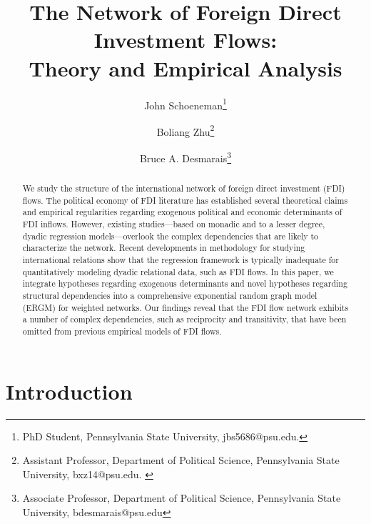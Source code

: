 \documentclass[12pt]{article}
\begin{document}
\title{The Network of Foreign Direct Investment Flows: \\Theory and Empirical Analysis}
\author{John  Schoeneman\thanks{\footnotesize{
PhD Student, Pennsylvania State University, jbs5686@psu.edu.}} \and Boliang Zhu\thanks{\footnotesize{Assistant Professor, Department of Political Science, Pennsylvania State University, bxz14@psu.edu. }} \and Bruce A. Desmarais\thanks{\footnotesize{Associate Professor, Department of Political Science, Pennsylvania State University, bdesmarais@psu.edu}}}
\date{}
\maketitle

\singlespacing
\begin{abstract}
    \noindent We study the structure of the international network of foreign direct investment (FDI) flows. The political economy of FDI literature has established several theoretical claims and empirical regularities regarding exogenous political and economic determinants of FDI inflows. %
    However, existing studies---based on monadic and to a lesser degree, dyadic regression models---overlook the complex dependencies that are likely to characterize the network. Recent developments in methodology for studying international relations show that the regression framework is typically inadequate for quantitatively modeling dyadic relational data, such as FDI flows. In this paper, we integrate hypotheses regarding exogenous determinants and novel hypotheses regarding structural dependencies into a comprehensive exponential random graph model (ERGM) for weighted networks. Our findings reveal that the FDI flow network  exhibits a number of complex dependencies, such as reciprocity and transitivity, that have been omitted from previous empirical models of FDI flows.

\end{abstract}

\clearpage
\doublespacing
\section{Introduction}
\end{document}
